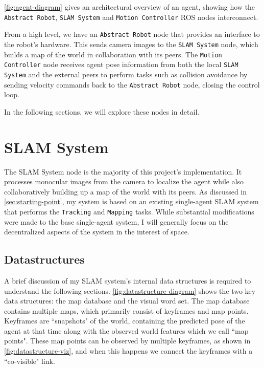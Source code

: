 \autoref{fig:agent-diagram} gives an architectural overview of an agent, showing how the \texttt{Abstract Robot}, \texttt{SLAM System} and \texttt{Motion Controller} ROS nodes interconnect.

From a high level, we have an \texttt{Abstract Robot} node that provides an interface to the robot's hardware. This sends camera images to the \texttt{SLAM System} node, which builds a map of the world in collaboration with its peers. The \texttt{Motion Controller} node receives agent pose information from both the local \texttt{SLAM System} and the external peers to perform tasks such as collision avoidance by sending velocity commands back to the \texttt{Abstract Robot} node, closing the control loop.

In the following sections, we will explore these nodes in detail.

\section{SLAM System}
\label{sec:slam-system}
The SLAM System node is the majority of this project's implementation. It processes monocular images from the camera to localize the agent while also collaboratively building up a map of the world with its peers. As discussed in \autoref{sec:starting-point}, my system is based on an existing single-agent SLAM system that performs the \texttt{Tracking} and \texttt{Mapping} tasks. While substantial modifications were made to the base single-agent system, I will generally focus on the decentralized aspects of the system in the interest of space.

\subsection{Datastructures}
\label{sec:datastructures}
A brief discussion of my SLAM system's internal data structures is required to understand the following sections. \autoref{fig:datastructure-diagram} shows the two key data structures: the map database and the visual word set. The map database contains multiple maps, which primarily consist of keyframes and map points. Keyframes are ``snapshots" of the world, containing the predicted pose of the agent at that time along with the observed world features which we call ``map points". These map points can be observed by multiple keyframes, as shown in \autoref{fig:datastructure-viz}, and when this happens we connect the keyframes with a ``co-visible" link.

